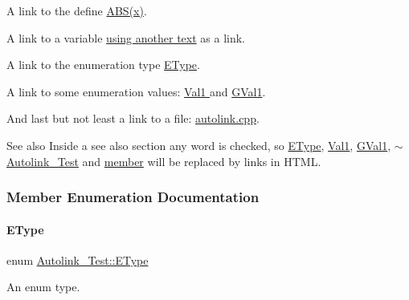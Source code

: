 A link to the define \hyperlink{autolink_8cpp_a996f7be338ccb40d1a2a5abc1ad61759}{A\+B\+S(x)}.

A link to a variable \hyperlink{class_autolink___test_a8de85603114bc9b9e53bd40764e9b499}{using another text} as a link.

A link to the enumeration type \hyperlink{class_autolink___test_aeb611627c332d067bded1806b1bb45c2}{E\+Type}.

A link to some enumeration values\+: \hyperlink{class_autolink___test_aeb611627c332d067bded1806b1bb45c2af70631e295bce280e74762d18af47a94}{Val1 } and \hyperlink{autolink_8cpp_a656d63cf384d2a6f23c2c18523a7bc5ea0f016f49e4f3bcd072319b9d68bc927d}{G\+Val1}.

And last but not least a link to a file\+: \hyperlink{autolink_8cpp}{autolink.\+cpp}.

\begin{DoxySeeAlso}{See also}
Inside a see also section any word is checked, so \hyperlink{class_autolink___test_aeb611627c332d067bded1806b1bb45c2}{E\+Type}, \hyperlink{class_autolink___test_aeb611627c332d067bded1806b1bb45c2af70631e295bce280e74762d18af47a94}{Val1}, \hyperlink{autolink_8cpp_a656d63cf384d2a6f23c2c18523a7bc5ea0f016f49e4f3bcd072319b9d68bc927d}{G\+Val1}, \hyperlink{class_autolink___test_a03bf46c8e2b733680035f524fd7b193b}{$\sim$\+Autolink\+\_\+\+Test} and \hyperlink{class_autolink___test_a393ea281f235a2f603d98daf72b0d411}{member} will be replaced by links in H\+T\+ML. 
\end{DoxySeeAlso}


\subsubsection{Member Enumeration Documentation}
\hypertarget{class_autolink___test_aeb611627c332d067bded1806b1bb45c2}{}\label{class_autolink___test_aeb611627c332d067bded1806b1bb45c2} 
\paragraph{\texorpdfstring{E\+Type}{EType}}
{\footnotesize\ttfamily enum \hyperlink{class_autolink___test_aeb611627c332d067bded1806b1bb45c2}{Autolink\+\_\+\+Test\+::\+E\+Type}}



An enum type. 

